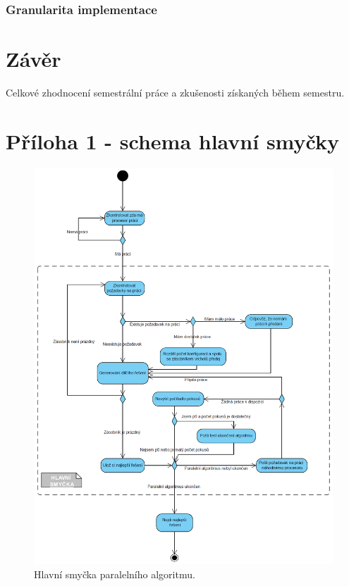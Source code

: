 \documentclass[12pt]{article}
\begin{document}
\subsubsection{Granularita implementace}

\section{Závěr}

Celkové zhodnocení semestrální práce a zkušenosti získaných během
semestru.

\section{Příloha 1 - schema hlavní smyčky}

\begin{figure}[ht]
\centering       
\includegraphics[scale=0.5]{while.jpg}
\caption{Hlavní smyčka paralelního algoritmu.}
\label{hlavniSmycka}
\end{figure}
\end{document}
